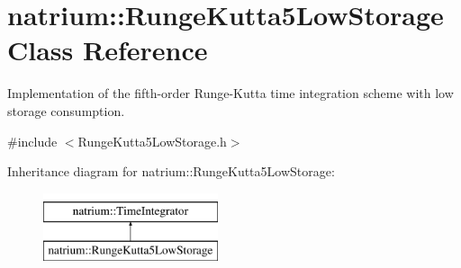 \hypertarget{classnatrium_1_1RungeKutta5LowStorage}{\section{natrium\-:\-:Runge\-Kutta5\-Low\-Storage Class Reference}
\label{classnatrium_1_1RungeKutta5LowStorage}
}


Implementation of the fifth-\/order Runge-\/\-Kutta time integration scheme with low storage consumption.  




{\ttfamily \#include $<$Runge\-Kutta5\-Low\-Storage.\-h$>$}

Inheritance diagram for natrium\-:\-:Runge\-Kutta5\-Low\-Storage\-:\begin{figure}[H]
\begin{center}
\leavevmode
\includegraphics[height=2.000000cm]{classnatrium_1_1RungeKutta5LowStorage}
\end{center}
\end{figure}
